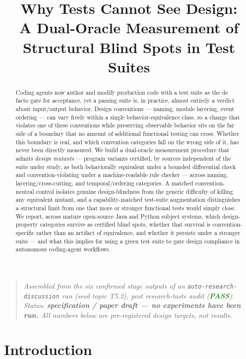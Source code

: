 \documentclass[11pt]{article}
\title{\textbf{Why Tests Cannot See Design:\\ A Dual-Oracle Measurement of Structural Blind Spots in Test Suites}}
\author{}
\date{}
\begin{document}
\maketitle
\vspace{-2em}

\begin{quote}
\small\textit{Assembled from the six confirmed stage outputs of an \texttt{auto-research-discussion} run (seed topic T5.2), post research-taste audit (\textcolor{ForestGreen}{\textbf{PASS}}). Status: \textbf{specification / paper draft --- no experiments have been run.} All numbers below are pre-registered design targets, not results.}
\end{quote}

\begin{abstract}
Coding agents now author and modify production code with a test suite as the de facto gate for acceptance, yet a passing suite is, in practice, almost entirely a verdict about input/output behavior. Design conventions --- naming, module layering, event ordering --- can vary freely within a single behavior-equivalence class, so a change that violates one of these conventions while preserving observable behavior sits on the far side of a boundary that no amount of additional functional testing can cross. Whether this boundary is real, and which convention categories fall on the wrong side of it, has never been directly measured. We build a dual-oracle measurement procedure that admits \emph{design mutants} --- program variants certified, by sources independent of the suite under study, as both behaviorally equivalent under a bounded differential check and convention-violating under a machine-readable rule checker --- across naming, layering/cross-cutting, and temporal/ordering categories. A matched convention-neutral control isolates genuine design-blindness from the generic difficulty of killing any equivalent mutant, and a capability-matched test-suite augmentation distinguishes a structural limit from one that more or stronger functional tests would simply close. We report, across mature open-source Java and Python subject systems, which design-property categories survive as certified blind spots, whether that survival is convention-specific rather than an artifact of equivalence, and whether it persists under a stronger suite --- and what this implies for using a green test suite to gate design compliance in autonomous coding-agent workflows.
\end{abstract}

\section{Introduction}
\end{document}
